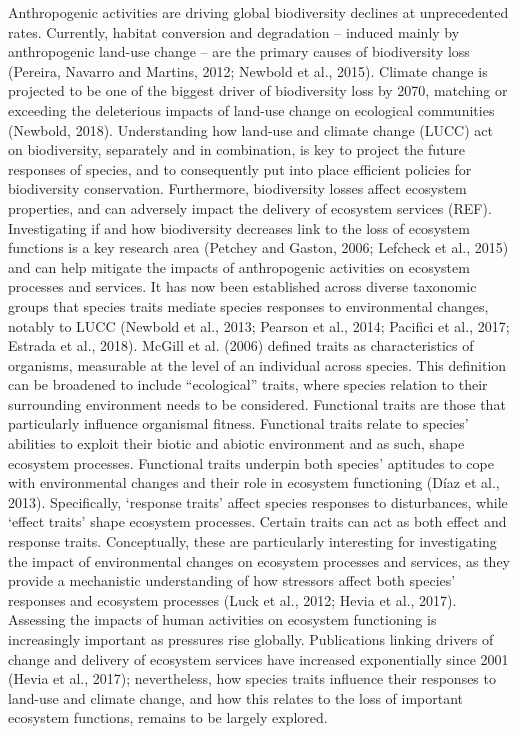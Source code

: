 Anthropogenic activities are driving global biodiversity declines at unprecedented rates. Currently, habitat conversion and degradation -- induced mainly by anthropogenic land-use change --  are the primary causes of biodiversity loss (Pereira, Navarro and Martins, 2012; Newbold et al., 2015). Climate change is projected to be one of the biggest driver of biodiversity loss by 2070, matching or exceeding the deleterious impacts of land-use change on ecological communities (Newbold, 2018). Understanding how land-use and climate change (LUCC) act on biodiversity, separately and in combination, is key to project the future responses of species, and to consequently put into place efficient policies for biodiversity conservation. Furthermore, biodiversity losses affect ecosystem properties, and can adversely impact the delivery of ecosystem services (REF). Investigating if and how biodiversity decreases link to the loss of ecosystem functions is a key research area (Petchey and Gaston, 2006; Lefcheck et al., 2015) and can help mitigate the impacts of anthropogenic activities on ecosystem processes and services.
It has now been established across diverse taxonomic groups that species traits mediate species responses to environmental changes, notably to LUCC (Newbold et al., 2013; Pearson et al., 2014; Pacifici et al., 2017; Estrada et al., 2018). McGill et al. (2006) defined traits as characteristics of organisms, measurable at the level of an individual across species. This definition can be broadened to include “ecological” traits, where species relation to their surrounding environment needs to be considered. Functional traits are those that particularly influence organismal fitness. Functional traits relate to species’ abilities to exploit their biotic and abiotic environment and as such, shape ecosystem processes. Functional traits underpin both species’ aptitudes to cope with environmental changes and their role in ecosystem functioning (Díaz et al., 2013). Specifically, ‘response traits’ affect species responses to disturbances, while ‘effect traits’ shape ecosystem processes. Certain traits can act as both effect and response traits. Conceptually, these are particularly interesting for investigating the impact of environmental changes on ecosystem processes and services, as they provide a mechanistic understanding of how stressors affect both species’ responses and ecosystem processes (Luck et al., 2012; Hevia et al., 2017).  Assessing the impacts of human activities on ecosystem functioning is increasingly important as pressures rise globally. Publications linking drivers of change and delivery of ecosystem services have increased exponentially since 2001 (Hevia et al., 2017); nevertheless, how species traits influence their responses to land-use and climate change, and how this relates to the loss of important ecosystem functions, remains to be largely explored.
